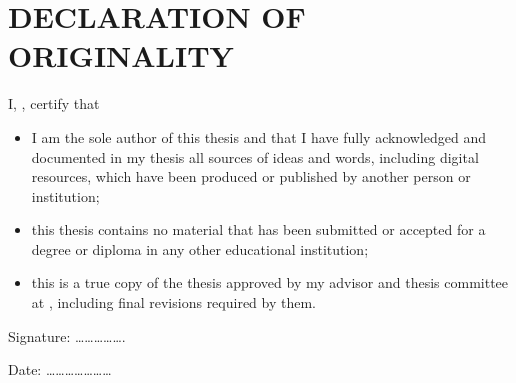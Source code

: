 \chapter*{\MakeUppercase{Declaration of Originality}}

\vspace*{20pt}

\noindent I, \authname, certify that 
\begin{itemize} 
	\item I am the sole author of this thesis and that I have fully acknowledged and documented in my thesis all sources of ideas and words, including digital resources, which have been produced or published by another person or institution;
	\item this thesis contains no material that has been submitted or accepted for a degree or diploma in any other educational institution;
	\item this is a true copy of the thesis approved by my advisor and thesis committee at \univname, including final revisions required by them.
\end{itemize}
 
\vspace{40pt}

\noindent Signature: \ldots\ldots\ldots\ldots\ldots.
 
\noindent Date: \ldots\ldots\ldots\ldots\ldots\ldots\dots


